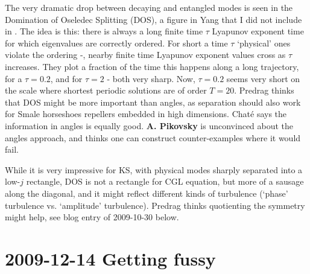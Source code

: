 \begin{description}
The very dramatic drop between decaying and entangled modes is
seen in the Domination of Oseledec Splitting (DOS), a figure in
Yang \etal{} that I did not include in
. The idea is this: there is always a
long finite time $\tau$ Lyapunov exponent time for which
eigenvalues are correctly ordered. For short a time $\tau$
`physical' ones violate the ordering -\ie, nearby finite time
Lyapunov exponent values cross as $\tau$ increases. They plot a
fraction of the time this happens along a long trajectory, for
a $\tau=0.2$, and for $\tau=2$ - both very sharp. Now,
$\tau=0.2$ seems very short on the scale where shortest
periodic solutions are of order $T=20$. Predrag thinks that DOS
might be more important than angles, as separation should also
work for Smale horseshoes repellers embedded in high
dimensions. Chat\'e says the information in angles is equally
good. {\bf A. Pikovsky} is unconvinced about the angles
approach, and thinks one can construct counter-examples where
it would fail.

While it is very impressive for KS, with physical modes sharply
separated into a low-$j$ rectangle, DOS is not a rectangle for
CGL equation, but more of a sausage along the diagonal, and it
might reflect different kinds of turbulence (`phase' turbulence
vs. `amplitude' turbulence). Predrag thinks quotienting the
symmetry might help, see blog entry of 2009-10-30 below.



\end{description}

\section{2009-12-14 Getting fussy}

